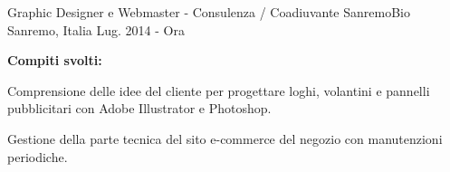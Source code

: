 {\begin{cventries}
  \cventry
  {Graphic Designer e Webmaster - Consulenza / Coadiuvante} %
  {SanremoBio} %
  {Sanremo, Italia} %
  {Lug. 2014 - Ora} %
  {
    \begin{cvparagraph}
      \textbf{Compiti svolti:}
    \end{cvparagraph}
    \begin{cvitems} %
      \item {Comprensione delle idee del cliente per progettare loghi, volantini e pannelli pubblicitari con Adobe Illustrator e Photoshop.}
      \item {Gestione della parte tecnica del sito e-commerce del negozio con manutenzioni periodiche.}
    \end{cvitems}
  }{}
\end{cventries}
}